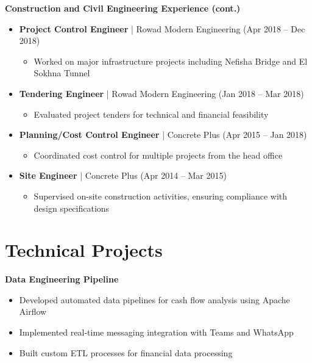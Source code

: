 \documentclass[10pt, letterpaper]{article}
\begin{document}
\begin{mdframed}[style=cvframe]
\begin{multicols}{2}
\textbf{\textcolor{primaryColor}{Construction and Civil Engineering Experience (cont.)}}
\begin{itemize}[leftmargin=*]
    \item \textbf{Project Control Engineer} | Rowad Modern Engineering (Apr 2018 -- Dec 2018)
    \begin{itemize}[leftmargin=1cm]
        \item Worked on major infrastructure projects including Nefisha Bridge and El Sokhna Tunnel
    \end{itemize}
    
    \item \textbf{Tendering Engineer} | Rowad Modern Engineering (Jan 2018 -- Mar 2018)
    \begin{itemize}[leftmargin=1cm]
        \item Evaluated project tenders for technical and financial feasibility
    \end{itemize}
    
    \item \textbf{Planning/Cost Control Engineer} | Concrete Plus (Apr 2015 -- Jan 2018)
    \begin{itemize}[leftmargin=1cm]
        \item Coordinated cost control for multiple projects from the head office
    \end{itemize}
    
    \item \textbf{Site Engineer} | Concrete Plus (Apr 2014 -- Mar 2015)
    \begin{itemize}[leftmargin=1cm]
        \item Supervised on-site construction activities, ensuring compliance with design specifications
    \end{itemize}
\end{itemize}

\section{Technical Projects}
\textbf{Data Engineering Pipeline}
\begin{itemize}[leftmargin=*]
    \item Developed automated data pipelines for cash flow analysis using Apache Airflow
    \item Implemented real-time messaging integration with Teams and WhatsApp
    \item Built custom ETL processes for financial data processing
\end{itemize}


\end{multicols}
\end{mdframed}
\end{document}
